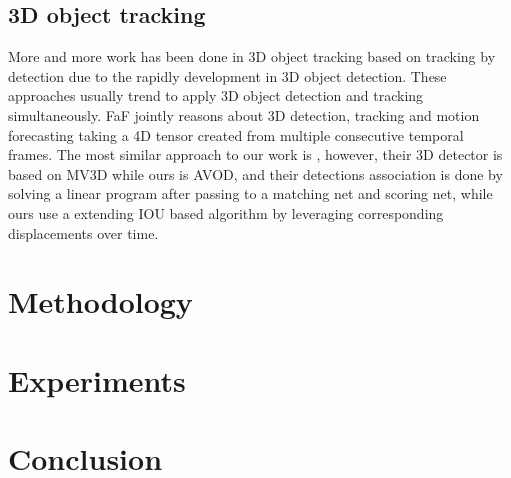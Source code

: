 \documentclass{bmvc2k}
\begin{document}
\subsection{3D object tracking}
More and more work has been done in 3D object tracking based on tracking by detection due to the rapidly development in 3D object detection. These approaches usually trend to apply 3D object detection and tracking simultaneously. FaF \cite{luo2018fast} jointly reasons about 3D detection, tracking and motion forecasting taking a 4D tensor created from multiple consecutive temporal frames. The most similar approach to our work is \cite{frossard2018end}, however, their 3D detector is based on MV3D while ours is AVOD, and their detections association is done by solving a linear program after passing to a matching net and scoring net, while ours use a extending IOU based algorithm \cite{bochinski2018extending} by leveraging corresponding displacements over time.
\section{Methodology}
\label{sec:method}


\section{Experiments}
\label{sec:experiments}


\section{Conclusion}
\label{sec:conclusion}



\end{document}
